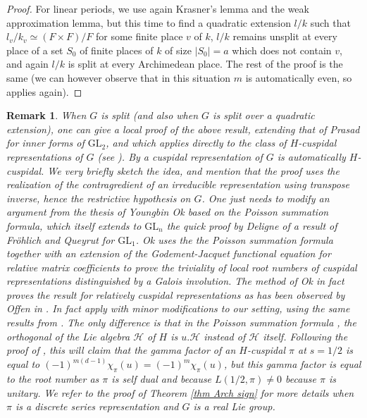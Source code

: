 \documentclass[11pt,letterpaper]{amsart}
\newcommand{\GL}{{\mathrm {GL}}} \newcommand{\PGL}{{\mathrm {PGL}}}
\theoremstyle{plain}
\newtheorem {rem}[thm]{Remark} \newtheorem{ex}[thm]{Example}
\numberwithin{equation}{section}
\begin{document}
\begin{proof}
For linear periods, we use again Krasner's lemma and the weak approximation lemma, but this time to find a quadratic extension $l/k$ such that 
$l_v/k_v\simeq (F\times F)/F$ for some finite place $v$ of $k$, $l/k$ remains unsplit at every place of a set $S_0$ of finite places of $k$ of size $|S_0|=a$ which does not contain $v$, and again $l/k$ is split at every Archimedean place. The rest of the proof is the same (we can however observe that in this situation $m$ is automatically even, so \cite[Theorem 1.1]{SYY} applies again).
\end{proof}

\begin{rem}\label{rem poisson}
When $G$ is split (and also when $G$ is split over a quadratic extension), one can give a local proof of the above result, extending that of Prasad for inner forms of $\GL_2$, and which applies directly to the class of $H$-cuspidal representations of $G$ (see \cite{KT}). By \cite{KT} a cuspidal representation of $G$ is automatically $H$-cuspidal. We very briefly sketch the idea, and mention that the proof uses the realization of the contragredient of an irreducible representation using transpose inverse, hence the restrictive hypothesis on $G$. One just needs to modify an argument from the thesis \cite{Ok} of Youngbin Ok based on the Poisson summation formula, which itself extends to $\GL_n$ the quick proof by Deligne \cite{Del} of a result of Fr\"ohlich and Queyrut \cite{FQ} for $\GL_1$. Ok uses the the Poisson summation formula together with an extension of the Godement-Jacquet functional equation for relative matrix coefficients to prove the triviality of local root numbers of cuspidal representations distinguished by a Galois involution. The method of Ok in fact proves the result for relatively cuspidal representations as has been observed by Offen in \cite{Offen}. In fact \cite[Sections 2.2 and 2.3]{Offen} apply with minor modifications to our setting, using the same results from \cite{GJ}. The only difference is that in the Poisson summation formula \cite[Lemma 2.2]{Offen}, the orthogonal of the Lie algebra $\mathcal{H}$ of $H$ is $u.\mathcal{H}$ instead of $\mathcal{H}$ itself. 
Following the proof of \cite[Proposition 2.1]{Offen}, this will claim that the gamma factor of an $H$-cuspidal $\pi$ at $s=1/2$ is equal to $(-1)^{m(d-1)}\chi_{\pi}(u)=(-1)^{m}\chi_{\pi}(u)$, but this gamma factor is equal to the root number as $\pi$ is self dual and because $L(1/2,\pi)\neq 0$ because $\pi$ is unitary. We refer to the proof of Theorem \ref{thm Arch sign} for more details when $\pi$ is a discrete series representation and $G$ is a real Lie group. 
\end{rem}
\end{document}
